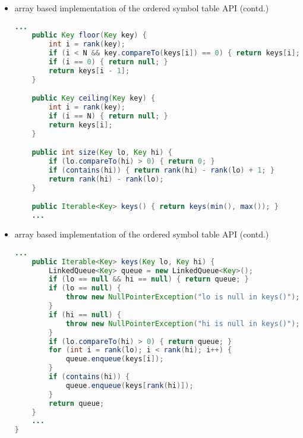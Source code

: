 \documentclass[8pt,a4paper,compress]{beamer}
\begin{document}
\begin{frame}[fragile]
\begin{itemize}
\item array based implementation of the ordered symbol table API (contd.)
\begin{lstlisting}[language=Java]
    ...
    public Key floor(Key key) {
        int i = rank(key);
        if (i < N && key.compareTo(keys[i]) == 0) { return keys[i]; }
        if (i == 0) { return null; }
        return keys[i - 1];
    }

    public Key ceiling(Key key) {
        int i = rank(key);
        if (i == N) { return null; }
        return keys[i];
    }

    public int size(Key lo, Key hi) {
        if (lo.compareTo(hi) > 0) { return 0; }
        if (contains(hi)) { return rank(hi) - rank(lo) + 1; }
        return rank(hi) - rank(lo);
    }

    public Iterable<Key> keys() { return keys(min(), max()); }
    ...
\end{lstlisting}
\end{itemize}
\end{frame}

\begin{frame}[fragile]
\begin{itemize}
\item array based implementation of the ordered symbol table API (contd.)
\begin{lstlisting}[language=Java]
    ...
    public Iterable<Key> keys(Key lo, Key hi) {
        LinkedQueue<Key> queue = new LinkedQueue<Key>(); 
        if (lo == null && hi == null) { return queue; }
        if (lo == null) {
            throw new NullPointerException("lo is null in keys()");
        }
        if (hi == null) {
            throw new NullPointerException("hi is null in keys()");
        }
        if (lo.compareTo(hi) > 0) { return queue; }
        for (int i = rank(lo); i < rank(hi); i++) {
            queue.enqueue(keys[i]);
        }
        if (contains(hi)) {
            queue.enqueue(keys[rank(hi)]);
        }
        return queue; 
    }    
    ...
}
\end{lstlisting}
\end{itemize}
\end{frame}
\end{document}
